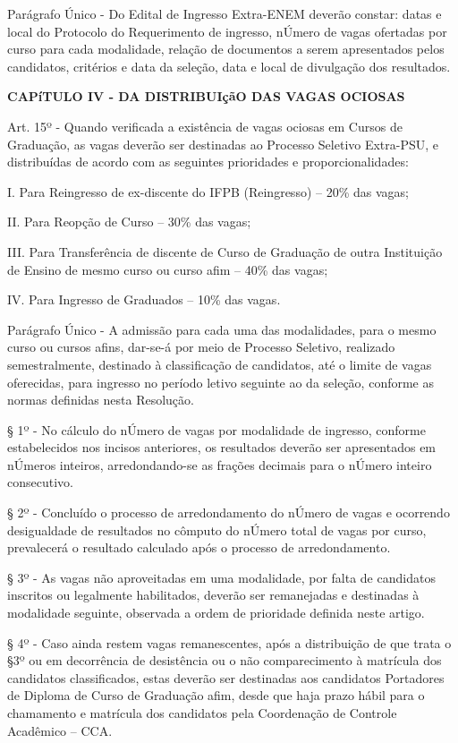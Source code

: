 Parágrafo Único - Do Edital de Ingresso Extra-ENEM deverão constar: datas e local do Protocolo do Requerimento de ingresso, nÚmero de vagas ofertadas por curso para cada modalidade, relação de documentos a serem apresentados pelos candidatos, critérios e data da seleção, data e local de divulgação dos resultados.

\vspace{4mm}
\textbf{CAPíTULO IV - DA DISTRIBUIçãO DAS VAGAS OCIOSAS}
\vspace{4mm}

Art. 15º - Quando verificada a existência de vagas ociosas em Cursos de Graduação, as vagas deverão ser destinadas ao Processo Seletivo Extra-PSU, e distribuídas de acordo com as seguintes prioridades e proporcionalidades:

I. Para Reingresso de ex-discente do IFPB (Reingresso) – 20\% das vagas;

II. Para Reopção de Curso – 30\% das vagas;

III. Para Transferência de discente de Curso de Graduação de outra Instituição de Ensino de mesmo curso ou curso afim – 40\% das vagas;

IV. Para Ingresso de Graduados – 10\% das vagas.

Parágrafo Único - A admissão para cada uma das modalidades, para o mesmo curso ou cursos afins, dar-se-á por meio de Processo Seletivo, realizado semestralmente, destinado à classificação de candidatos, até o limite de vagas oferecidas, para ingresso no período letivo seguinte ao da seleção, conforme as normas definidas nesta Resolução.

§ 1º - No cálculo do nÚmero de vagas por modalidade de ingresso, conforme estabelecidos nos incisos anteriores, os resultados deverão ser apresentados em nÚmeros inteiros, arredondando-se as frações decimais para o nÚmero inteiro consecutivo.

§ 2º - Concluído o processo de arredondamento do nÚmero de vagas e ocorrendo desigualdade de resultados no cômputo do nÚmero total de vagas por curso, prevalecerá o resultado calculado após o processo de arredondamento.

§ 3º - As vagas não aproveitadas em uma modalidade, por falta de candidatos inscritos ou legalmente habilitados, deverão ser remanejadas e destinadas à modalidade seguinte, observada a ordem de prioridade definida neste artigo.

§ 4º - Caso ainda restem vagas remanescentes, após a distribuição de que trata o §3º ou em decorrência de desistência ou o não comparecimento à matrícula dos candidatos classificados, estas deverão ser destinadas aos candidatos Portadores de Diploma de Curso de Graduação afim, desde que haja prazo hábil para o chamamento e matrícula dos candidatos pela Coordenação de Controle Acadêmico – CCA.

